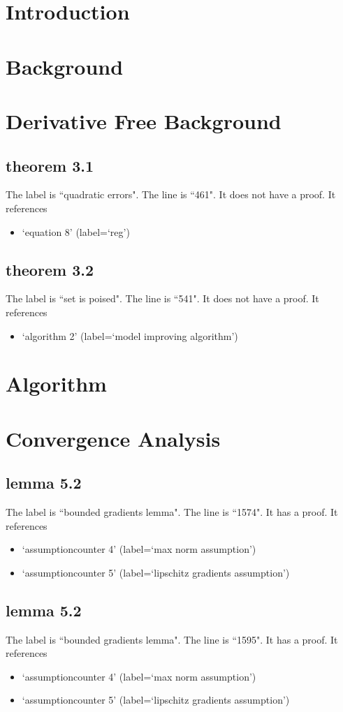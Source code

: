 \documentclass{article}
\begin{document}
\section{Introduction}
\section{Background}
\section{Derivative Free Background}
\subsection{theorem 3.1}
The label is ``quadratic errors".
The line is ``461".
It does not have a proof.
It references \begin{itemize}
\item `equation 8' (label=`reg')
\end{itemize}
\subsection{theorem 3.2}
The label is ``set is poised".
The line is ``541".
It does not have a proof.
It references \begin{itemize}
\item `algorithm 2' (label=`model improving algorithm')
\end{itemize}
\section{Algorithm}
\section{Convergence Analysis}
\subsection{lemma 5.2}
The label is ``bounded gradients lemma".
The line is ``1574".
It has a proof.
It references \begin{itemize}
\item `assumptioncounter 4' (label=`max norm assumption')
\item `assumptioncounter 5' (label=`lipschitz gradients assumption')
\end{itemize}
\subsection{lemma 5.2}
The label is ``bounded gradients lemma".
The line is ``1595".
It has a proof.
It references \begin{itemize}
\item `assumptioncounter 4' (label=`max norm assumption')
\item `assumptioncounter 5' (label=`lipschitz gradients assumption')
\end{itemize}
\end{document}
